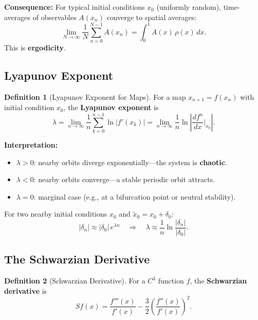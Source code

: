 \documentclass[11pt,letterpaper]{article}
\theoremstyle{definition}
\newtheorem{definition}{Definition}[section]
\theoremstyle{plain}
\theoremstyle{remark}
\begin{document}
\textbf{Consequence:}  For typical initial conditions $x_0$ (uniformly
random), time-averages of observables $A(x_n)$ converge to spatial
averages:
\[
  \lim_{N\to\infty}\frac{1}{N}\sum_{n=0}^{N-1}A(x_n)
  = \int_0^1 A(x)\,\rho(x)\,dx.
\]
This is \textbf{ergodicity}.

\subsection{Lyapunov Exponent}\label{sec:lyapunov-exp}

\begin{definition}[Lyapunov Exponent for Maps]
For a map $x_{n+1} = f(x_n)$ with initial condition $x_0$, the
\textbf{Lyapunov exponent} is
\begin{equation}\label{eq:lyap-map}
  \lambda = \lim_{n\to\infty}\frac{1}{n}\sum_{k=0}^{n-1}\ln|f'(x_k)|
  = \lim_{n\to\infty}\frac{1}{n}\ln\left|\frac{d f^n}{dx}\bigg|_{x_0}\right|.
\end{equation}
\end{definition}

\textbf{Interpretation:}
\begin{itemize}[leftmargin=2em]
\item $\lambda > 0$: nearby orbits diverge exponentially---the system is
      \textbf{chaotic}.
\item $\lambda < 0$: nearby orbits converge---a stable periodic orbit
      attracts.
\item $\lambda = 0$: marginal case (e.g., at a bifurcation point or
      neutral stability).
\end{itemize}

For two nearby initial conditions $x_0$ and $\tilde{x}_0 = x_0 + \delta_0$:
\[
  |\delta_n| \approx |\delta_0|\,e^{\lambda n}
  \quad\Longrightarrow\quad
  \lambda \approx \frac{1}{n}\ln\frac{|\delta_n|}{|\delta_0|}.
\]

\subsection{The Schwarzian Derivative}

\begin{definition}[Schwarzian Derivative]
For a $C^3$ function $f$, the \textbf{Schwarzian derivative} is
\begin{equation}
  Sf(x) = \frac{f'''(x)}{f'(x)} - \frac{3}{2}
  \left(\frac{f''(x)}{f'(x)}\right)^2.
\end{equation}
\end{definition}
\end{document}

